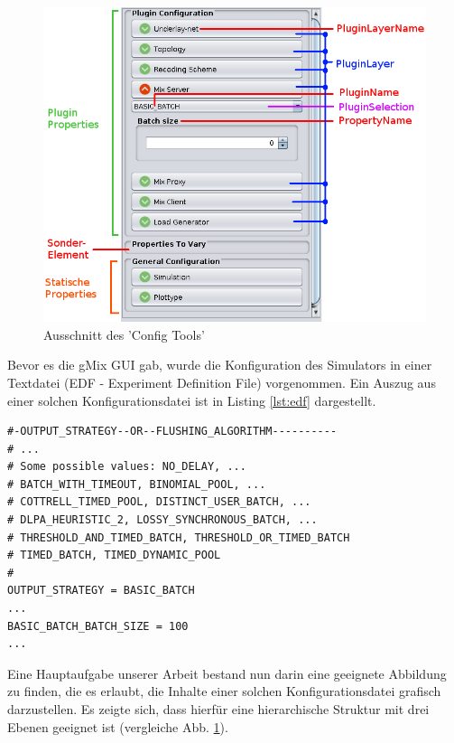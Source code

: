 \documentclass[a4paper, 11pt]{article} %
\begin{document}
\begin{figure}[!htp]

\includegraphics[scale=0.56]{img/configtool_edit.png}

\caption{Ausschnitt des 'Config Tools'}
\label{fig:guielements}
\end{figure}

Bevor es die gMix GUI gab, wurde die Konfiguration des Simulators in einer Textdatei (EDF - Experiment Definition File) vorgenommen. Ein Auszug aus einer solchen Konfigurationsdatei ist in Listing \ref{lst:edf} dargestellt. 

\newpage

\begin{lstlisting}[caption={Auszug aus einer Simulator Konfiguration},label=lst:edf,frame=lrtb]
#-OUTPUT_STRATEGY--OR--FLUSHING_ALGORITHM----------
# ...
# Some possible values: NO_DELAY, ... 
# BATCH_WITH_TIMEOUT, BINOMIAL_POOL, ... 
# COTTRELL_TIMED_POOL, DISTINCT_USER_BATCH, ... 
# DLPA_HEURISTIC_2, LOSSY_SYNCHRONOUS_BATCH, ...
# THRESHOLD_AND_TIMED_BATCH, THRESHOLD_OR_TIMED_BATCH 
# TIMED_BATCH, TIMED_DYNAMIC_POOL
#	
OUTPUT_STRATEGY = BASIC_BATCH
...
BASIC_BATCH_BATCH_SIZE = 100
...
\end{lstlisting}

Eine Hauptaufgabe unserer Arbeit bestand nun darin eine geeignete Abbildung zu finden, die es erlaubt, die Inhalte einer solchen Konfigurationsdatei grafisch darzustellen. Es zeigte sich, dass hierfür eine hierarchische Struktur mit drei Ebenen geeignet ist (vergleiche Abb. \ref{fig:guielements}).
\end{document}
